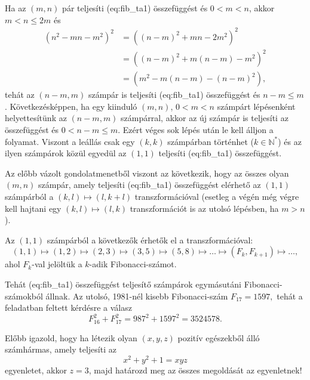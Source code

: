 \begin{solution}
Ha az $(m,n)$ pár teljesíti \aref({eq:fib_ta1}) összefüggést és $0<m<n$,
akkor $m<n\le2m$ és 
\begin{align*}
(n^{2}-mn-m^{2})^{2} & =\left((n-m)^{2}+mn-2m^{2}\right)^{2}\\
 & =\left((n-m)^{2}+m(n-m)-m^{2}\right)^{2}\\
 & =\left(m^{2}-m(n-m)-(n-m)^{2}\right),
\end{align*}
tehát az $(n-m,m)$ számpár is teljesíti \aref({eq:fib_ta1}) összefüggést
és $n-m\le m$. Következésképpen, ha egy kiinduló $(m,n)$, $0<m<n$
számpárt lépésenként helyettesítünk az $(n-m,m)$ számpárral, akkor
az új számpár is teljesíti az összefüggést és $0<n-m\le m$. Ezért
véges sok lépés után le kell álljon a folyamat. Viszont a leállás
csak egy $(k,k)$ számpárban történhet ($k\in\mathbb{N}^{*}$) és
az ilyen számpárok közül egyedül az $(1,1)$ teljesíti \aref({eq:fib_ta1})
összefüggést.

Az előbb vázolt gondolatmenetből viszont az következik, hogy az összes
olyan $(m,n)$ számpár, amely teljesíti \aref({eq:fib_ta1}) összefüggést
elérhető az $(1,1)$ számpárból a $(k,l)\mapsto(l,k+l)$ transzformációval
(esetleg a végén még végre kell hajtani egy $(k,l)\mapsto(l,k)$ transzformációt
is az utolsó lépésben, ha $m>n$).

Az $(1,1)$ számpárból a következők érhetők el a transzformációval:
\[
(1,1)\mapsto(1,2)\mapsto(2,3)\mapsto(3,5)\mapsto(5,8)\mapsto\dots\mapsto(F_{k},F_{k+1})\mapsto\dots,
\]
ahol $F_{k}$-val jelöltük a $k$-adik Fibonacci-számot.

Tehát \aref({eq:fib_ta1}) összefüggést teljesítő számpárok egymásutáni
Fibonacci-számokból állnak. Az utolsó, 1981-nél kisebb Fibonacci-szám
$F_{17}=1597,$ tehát a feladatban feltett kérdésre a válasz 
\[
F_{16}^{2}+F_{17}^{2}=987^{2}+1597^{2}=3524578.
\]
\end{solution}
\begin{extraproblem}
Előbb igazold, hogy ha létezik olyan $(x,y,z)$ pozitív egészekből
álló számhármas, amely teljesíti az 
\begin{equation}
x^{2}+y^{2}+1=xyz\label{eq:ta5}
\end{equation}
egyenletet, akkor $z=3$, majd határozd meg az összes megoldását az
egyenletnek! 
\end{extraproblem}

